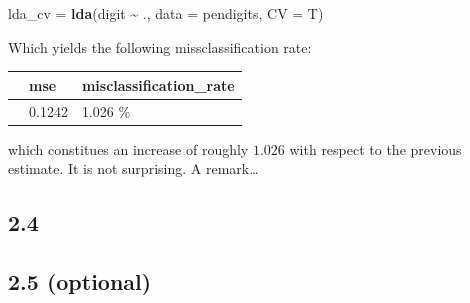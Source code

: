 \documentclass[
]{article}
\newenvironment{Shaded}{\begin{snugshade}}{\end{snugshade}}
\newcommand{\AttributeTok}[1]{\textcolor[rgb]{0.13,0.29,0.53}{#1}}
\newcommand{\FunctionTok}[1]{\textcolor[rgb]{0.13,0.29,0.53}{\textbf{#1}}}
\newcommand{\NormalTok}[1]{#1}
\newcommand{\OtherTok}[1]{\textcolor[rgb]{0.56,0.35,0.01}{#1}}
\newcommand{\SpecialCharTok}[1]{\textcolor[rgb]{0.81,0.36,0.00}{\textbf{#1}}}
\theoremstyle{plain}
\begin{document}
\smallskip

\begin{Shaded}
\begin{Highlighting}[]
\NormalTok{lda\_cv }\OtherTok{=} \FunctionTok{lda}\NormalTok{(digit }\SpecialCharTok{\textasciitilde{}}\NormalTok{ ., }\AttributeTok{data =}\NormalTok{ pendigits, }\AttributeTok{CV =}\NormalTok{ T)}
\end{Highlighting}
\end{Shaded}

Which yields the following missclassification rate:

\smallskip

\begin{longtable}[]{@{}lll@{}}
\toprule\noalign{}
& mse & misclassification\_rate \\
\midrule\noalign{}
\endhead
\bottomrule\noalign{}
\endlastfoot
& 0.1242 & 1.026 \% \\
\end{longtable}

which constitues an increase of roughly \(1.026 %
\) with respect to the previous estimate. It is not surprising. A
remark\ldots{}

\hypertarget{section-8}{%
\subsection{2.4}\label{section-8}}

\hypertarget{optional}{%
\subsection{2.5 (optional)}\label{optional}}
\end{document}
